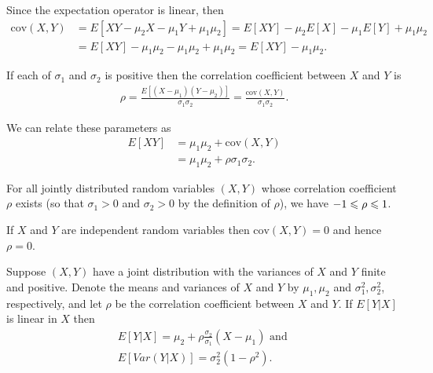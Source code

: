 \begin{remark}
    Since the expectation operator is linear, then
    \begin{align*}
        \text{cov}(X,Y) &= E[XY-\mu_2X-\mu_1Y+\mu_1\mu_2] = E[XY] - \mu_2E[X] - \mu_1 E[Y] +\mu_1\mu_2\\
                        &= E[XY] - \mu_1\mu_2-\mu_1\mu_2+\mu_1\mu_2 = E[XY] - \mu_1\mu_2. 
    \end{align*}
\end{remark}

\begin{definition}{}{}
    If each of $\sigma_1$ and $\sigma_2$ is positive then the correlation coefficient between $X$ and $Y$ is 
    \begin{align*}
        \rho = \frac{E[(X-\mu_1)(Y-\mu_2)]}{\sigma_1\sigma_2} = \frac{\text{cov}(X,Y)}{\sigma_1\sigma_2}.
    \end{align*}
\end{definition}

\begin{remark}
    We can relate these parameters as
    \begin{align*}
        E[XY]  &=\mu_1\mu_2 +\text{cov}(X,Y)\\
            &= \mu_1\mu_2 +\rho\sigma_1\sigma_2.
    \end{align*}
\end{remark}

\begin{theorem}{}{}
    For all jointly distributed random variables $(X,Y)$ whose correlation coefficient $\rho$ exists
    (so that $\sigma_1>0$ and $\sigma_2>0$ by the definition of $\rho$), we have $-1\leqslant \rho \leqslant 1$.
\end{theorem}

\begin{theorem}{}{}
    If $X$ and $Y$ are independent random variables then $\text{cov}(X,Y)=0$ and hence $\rho=0$.
\end{theorem}

\begin{theorem}{}{}
    Suppose $(X,Y)$ have a joint distribution with the variances of $X$ and $Y$ finite and positive.
    Denote the means and variances of $X$ and $Y$ by $\mu_1,\mu_2$ and $\sigma_1^2,\sigma_2^2$, respectively,
    and let $\rho$ be the correlation coefficient between $X$ and $Y$. If $E[Y|X]$ is linear in $X$ then
    \begin{align*}
        E[Y|X] = \mu_2 + \rho \frac{\sigma_2}{\sigma_1}(X-\mu_1) \text{ and }\\
        E[Var(Y|X)] = \sigma_2^2(1-\rho^2).
    \end{align*}
\end{theorem}



